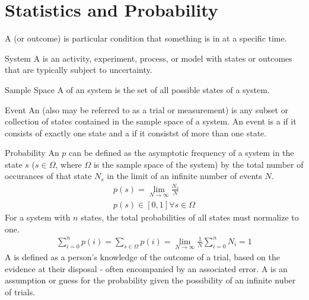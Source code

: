\chapter{Statistics and Probability}
\thispagestyle{fancy}

A  (or outcome) is particular condition that something is in at a specific time. 

\begin{defn}[System]{System}
A  is an activity, experiment, process, or model with states or outcomes that are typically subject to uncertainty.
\end{defn}

\begin{defn}{Sample Space}
A  of an system is the set of all possible states of a system.
\end{defn}

\begin{defn}[Event]{Event}
An  (also may be referred to as a trial or measurement) is any subset or collection of states contained in the sample space of a system. An event is a  if it consists of exactly one state and a  if it consistst of more than one state.
\end{defn}

\begin{defn}[Probability]{Probability}
An  $p$ can be defined as the asymptotic frequency of a system in the state $s$ ($s \in \Omega$, where $\Omega$ is the sample space of the system) by the total number of occurances of that state $N_s$ in the limit of an infinite number of events $N$.
    \begin{align}
        p(s) = \lim_{N\rightarrow\infty}\frac{N_s}{N} \\
	p(s) \in [0,1] \forall s \in \Omega
    \end{align}
For a system with $n$ states, the total probabilities of all states must normalize to one.
    \begin{align}
        \sum_{i=0}^{n}p(i) = \sum_{s \in \Omega}p(i) = \lim_{N\rightarrow\infty}\frac{1}{N}\sum_{i=0}^{n}N_i = 1
    \end{align}
A  is defined as a person's knowledge of the outcome of a trial, based on the evidence at their disposal - often encompanied by an associated error. A  is an assumption or guess for the probability given the possibility of an infinite nuber of trials.
\end{defn}

